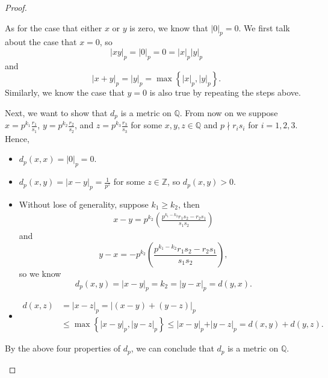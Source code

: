 \begin{proof}
\begin{itemize}
    As for the case that either \(x\) or \(y\) is zero, we know that \(\vert 0 \vert_p = 0 \). We first talk about the case that \(x=0\), so 
    \[
      \vert xy \vert_p = \vert 0 \vert_p = 0 = \vert x \vert_p \vert y \vert_p
    \]  and 
    \[
      \vert x+y \vert_p =  \vert y \vert_p = \max \left\{ \vert x \vert_ p, \vert y \vert_p   \right\}  .
    \] 
    Similarly, we know the case that \(y=0\) is also true by repeating the steps above. 
    
    Next, we want to show that \(d_p\) is a metric on \(\mathbb{Q} \). From now on we suppose \(x = p^{k_1} \frac{r_1}{s_1}\), \(y = p^{k_2} \frac{r_2}{s_2}\), and \(z = p^{k_3} \frac{r_3}{s_3}\) for some \(x,y,z \in \mathbb{Q} \) and \(p \nmid r_i s_i\) for \(i=1,2,3\). Hence,       
    \begin{itemize}
      \item \(d_p(x, x) = \vert 0 \vert_p = 0 \). 
      \item \(d_p(x,y) = \vert x-y \vert_p = \frac{1}{p^z}\) for some \(z \in \mathbb{Z} \), so \(d_p(x,y) > 0\). 
      \item Without lose of generality, suppose \(k_1 \ge k_2\), then\begin{align*}
        x - y = p^{k_2} \left( \frac{p^{k_1 - k_2}r_1 s_2 - r_2 s_1}{s_1 s_2} \right) 
      \end{align*}
      and 
      \[
        y - x = -p^{k_2} \left( \frac{p^{k_1 - k_2}r_1 s_2 - r_2 s_1}{s_1 s_2} \right), 
      \]
      so we know 
      \[
        d_p(x,y) = \vert x - y \vert_p = k_2 = \vert y - x \vert_p = d(y,x).  
      \]
      \item
      \begin{align*}
        d(x,z) &= \vert x-z \vert_p =  \left\vert (x-y) + (y-z) \right\vert _p \\ 
        &\le \max \left\{ \vert x-y \vert_p, \vert y-z \vert_p   \right\} \le \vert x-y \vert_p + \vert y-z \vert_p = d(x,y) + d(y,z).
      \end{align*}
    \end{itemize} 
    By the above four properties of \(d_p\), we can conclude that \(d_p\) is a metric on \(\mathbb{Q} \).    
  \end{itemize}
\end{proof}

